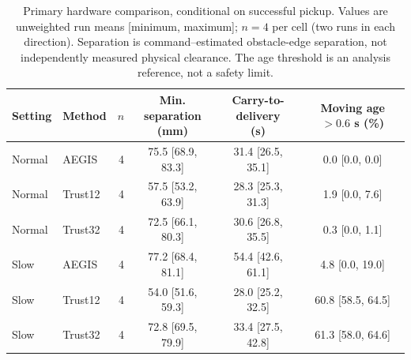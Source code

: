 \begin{table}[H]
\centering
\small
\caption{Primary hardware comparison, conditional on successful pickup. Values are unweighted run means [minimum, maximum]; $n=4$ per cell (two runs in each direction). Separation is command--estimated obstacle-edge separation, not independently measured physical clearance. The age threshold is an analysis reference, not a safety limit.}
\label{tab:hardware-primary}
\begin{tabular}{llrccc}
\toprule
Setting & Method & $n$ & \shortstack{Min. separation\\(mm)} & \shortstack{Carry-to-delivery\\(s)} & \shortstack{Moving age $>0.6$ s\\(\%)} \\
\midrule
Normal & AEGIS & 4 & 75.5 [68.9, 83.3] & 31.4 [26.5, 35.1] & 0.0 [0.0, 0.0] \\
Normal & Trust12 & 4 & 57.5 [53.2, 63.9] & 28.3 [25.3, 31.3] & 1.9 [0.0, 7.6] \\
Normal & Trust32 & 4 & 72.5 [66.1, 80.3] & 30.6 [26.8, 35.5] & 0.3 [0.0, 1.1] \\
Slow & AEGIS & 4 & 77.2 [68.4, 81.1] & 54.4 [42.6, 61.1] & 4.8 [0.0, 19.0] \\
Slow & Trust12 & 4 & 54.0 [51.6, 59.3] & 28.0 [25.2, 32.5] & 60.8 [58.5, 64.5] \\
Slow & Trust32 & 4 & 72.8 [69.5, 79.9] & 33.4 [27.5, 42.8] & 61.3 [58.0, 64.6] \\
\bottomrule
\end{tabular}
\end{table}
